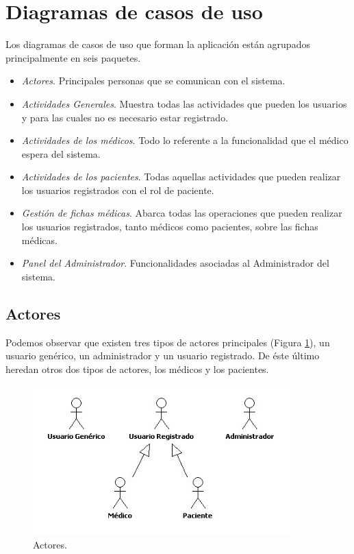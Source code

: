 \documentclass[a4paper,oneside,11pt]{book}
\begin{document}
	
	\section{Diagramas de casos de uso} %
	\label{sub:diagramas_de_casos_de_uso}
	
		Los diagramas de casos de uso que forman la aplicación están agrupados principalmente en seis paquetes.
		\begin{itemize}
			\item \textit{Actores}. Principales personas que se comunican con el sistema.
			\item \textit{Actividades Generales}. Muestra todas las actividades que pueden los usuarios y para las cuales no es necesario estar registrado.
			\item \textit{Actividades de los médicos}. Todo lo referente a la funcionalidad que el médico espera del sistema.
			\item \textit{Actividades de los pacientes}. Todas aquellas actividades que pueden realizar los usuarios registrados con el rol de paciente.
			\item \textit{Gestión de fichas médicas}. Abarca todas las operaciones que pueden realizar los usuarios registrados, tanto médicos como pacientes, sobre las fichas médicas.
			\item \textit{Panel del Administrador}. Funcionalidades asociadas al Administrador del sistema.
		\end{itemize}
	
	
		\subsection{Actores} %
		\label{sec:actores}
			Podemos observar que existen tres tipos de actores principales (Figura \ref{fig:actores}), un usuario genérico, un administrador y un usuario registrado. De éste último heredan otros dos tipos de actores, los médicos y los pacientes.
			\begin{figure}[H]
			  \centering
			    \includegraphics[width=10cm]{img/jpg/casos_uso/Actores.jpg}
			  \caption{Actores.}
			  \label{fig:actores}
			\end{figure}
			
\end{document}
